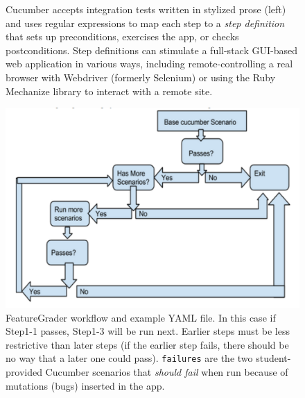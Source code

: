 \begin{figure}
  \begin{minipage}{0.45\textwidth}%
  \end{minipage}%
  \begin{minipage}{0.5\textwidth}%
  \end{minipage}%
  \caption{\label{fig:cucumber} Cucumber accepts integration tests 
    written in stylized prose (left) and uses regular expressions to map each
    step to a \emph{step definition} that sets up preconditions, exercises the app,
    or checks postconditions.  Step definitions 
    can stimulate a full-stack GUI-based web application in various
    ways, including remote-controlling a real browser with Webdriver
    (formerly Selenium) or using the Ruby Mechanize library to interact
    with a remote site.}
\end{figure}



\begin{figure}
  \begin{minipage}{0.45\textwidth}%
  \includegraphics[width=\textwidth]{figs/feature_grader.pdf}%
  \end{minipage}%
  \begin{minipage}{0.55\textwidth}%
  \end{minipage}
  \caption{\label{fig:featuregrader}%
FeatureGrader workflow and example YAML file.  In this case if Step1-1 passes,
Step1-3 will be run next.  Earlier steps must be less restrictive than
later steps (if the earlier step fails, there should be no way that a later one could pass).
\texttt{failures} are the two student-provided Cucumber scenarios that \emph{should fail} when
run because of mutations (bugs) inserted in the app.
}
\end{figure}

